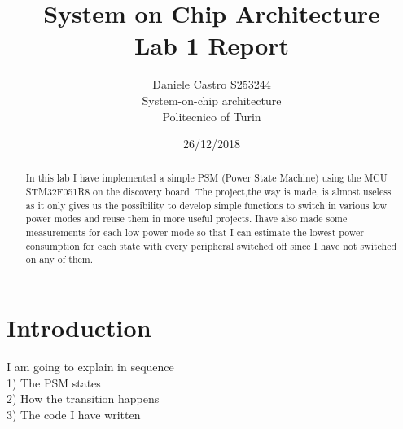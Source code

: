 \documentclass[peerreview]{IEEEtran}
\begin{document}
\title{System on Chip Architecture \\ Lab 1 Report}


\author{Daniele Castro S253244\\
System-on-chip architecture\\
Politecnico of Turin\\
}
\date{26/12/2018}

\maketitle
\tableofcontents
\listoffigures

\IEEEpeerreviewmaketitle
\begin{abstract}
In this lab I have implemented a simple PSM (Power State Machine) using the MCU STM32F051R8 on the discovery board. The project,the way is made, is almost useless as it only gives us the possibility to develop simple functions to switch in various low power modes and reuse them in more useful projects. Ihave also made some measurements for each low power mode so that I can estimate the lowest power consumption for each state with every peripheral switched off since I have not switched on any of them.
\end{abstract}
\section{Introduction}
I am going to explain in sequence\\
1) The PSM states\\
2) How the transition happens\\
3) The code I have written
\end{document}
